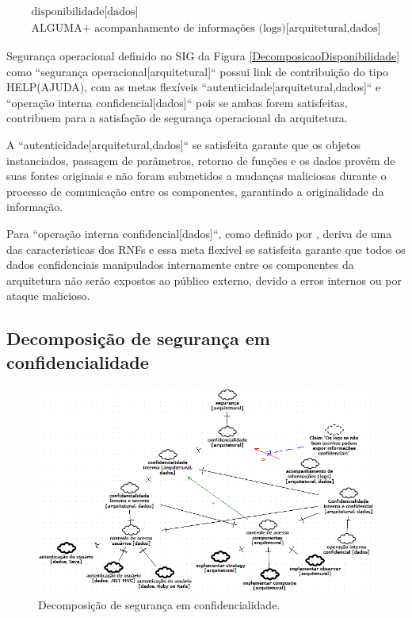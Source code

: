 \begin{eqnarray}
\label{eq:disponibilidadeImpacto}
\textrm{disponibilidade[dados]}  \nonumber\\
\textrm{ALGUMA+ acompanhamento de informações (logs)[arquitetural,dados]} 
\end{eqnarray}

Segurança operacional definido no SIG da Figura \ref{DecomposicaoDisponibilidade} como ``segurança operacional[arquitetural]`` possui link de contribuição do tipo HELP(AJUDA), com as metas flexíveis ``autenticidade[arquitetural,dados]`` e ``operação interna confidencial[dados]`` pois se ambas forem satisfeitas, contribuem para a satisfação de segurança operacional da arquitetura. 

A ``autenticidade[arquitetural,dados]`` se satisfeita garante que os objetos instanciados, passagem de parâmetros, retorno de funções e os dados provém de suas fontes originais e não foram submetidos a mudanças maliciosas durante o processo de comunicação entre os componentes, garantindo a originalidade da informação.

Para ``operação interna confidencial[dados]``, como definido por \cite{chung2012non}, deriva de uma das características dos RNFs e essa meta flexível se satisfeita garante que todos os dados confidenciais manipulados internamente entre os componentes da arquitetura não serão expostos ao público externo, devido a erros internos ou por ataque malicioso. 

\pagebreak

\subsection{Decomposição de segurança em confidencialidade}
\label{sub: DecomposicaoDeSegurancaEmConfidencialidade}

\begin{figure}[h!]
	\centering
	\includegraphics[keepaspectratio=true,scale=0.9]{figuras/SIG-Confidencialidade.PNG}
	\caption{Decomposição de segurança em confidencialidade.}
	\label{DecomposicaoConfidencialidade}
\end{figure}

